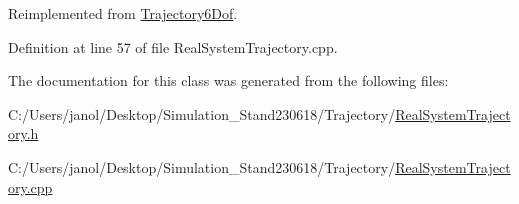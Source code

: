 Reimplemented from \hyperlink{class_trajectory6_dof_aafe86c414f4717075a3e0f40c0543fa1}{Trajectory6\+Dof}.



Definition at line 57 of file Real\+System\+Trajectory.\+cpp.



The documentation for this class was generated from the following files\+:\begin{DoxyCompactItemize}
\item 
C\+:/\+Users/janol/\+Desktop/\+Simulation\+\_\+\+Stand230618/\+Trajectory/\hyperlink{_real_system_trajectory_8h}{Real\+System\+Trajectory.\+h}\item 
C\+:/\+Users/janol/\+Desktop/\+Simulation\+\_\+\+Stand230618/\+Trajectory/\hyperlink{_real_system_trajectory_8cpp}{Real\+System\+Trajectory.\+cpp}\end{DoxyCompactItemize}
